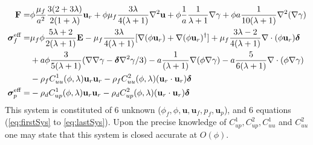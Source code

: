 \begin{align}
    \textbf{F}=&
    \phi
    \frac{\mu_f}{a^2}
    \frac{3(2+3\lambda)}{2(1+\lambda)}\textbf{u}_r
    + \phi\mu_f  \frac{3\lambda}{4(\lambda +1)} \grad^2 \textbf{u}
    + \phi \frac{1}{a}\frac{1}{\lambda +1} \grad \gamma
    + \phi a \frac{1}{10(\lambda +1)}\grad^2(\grad\gamma)\\
    \bm\sigma_f^\text{eff}
    =&
     \mu_f \phi \frac{5\lambda +2}{2(\lambda+1)} \textbf{E}
    - \mu_f \frac{3\lambda}{4(\lambda+1)} [
    \grad(\phi \textbf{u}_r)
    + \grad(\phi \textbf{u}_r)^\dagger]
    + \mu_f \frac{3\lambda - 2}{4(\lambda+1)} \div(\phi \textbf{u}_r)  \bm\delta\nonumber\\
    &+ a\phi \frac{3}{5(\lambda+1)}(\grad\grad\gamma-\bm\delta \grad^2\gamma/3)
    - a \frac{1}{(\lambda+1)}\grad (\phi \grad \gamma)
    - a \frac{5}{6(\lambda+1)}\div (\phi \grad \gamma)
    \nonumber \\
    &-\rho_f C^1_{uu}(\phi,\lambda)  \textbf{u}_r \textbf{u}_r
    -\rho_f C^2_{uu} (\phi,\lambda) (\textbf{u}_r \cdot \textbf{u}_r)\bm\delta
    \label{eq:sigma_feffff}\\
    \bm\sigma_p^\text{eff}
    =&
    -\rho_d C^1_{up}(\phi,\lambda) \textbf{u}_r \textbf{u}_r
    -\rho_d C^2_{up}(\phi,\lambda) (\textbf{u}_r \cdot \textbf{u}_r)\bm\delta
\end{align}
This system is constituted of 6 unknown ($\phi_f,\phi,\textbf{u},\textbf{u}_f,p_f,\textbf{u}_p$), and 6 equations (\ref{eq:firstSys} to \ref{eq:lastSys}).  
Upon the precise knowledge of $C^1_{up}, C^2_{up}, C^1_{uu}$ and $C^2_{uu}$ one may state that this system is closed accurate at $O(\phi)$. 

